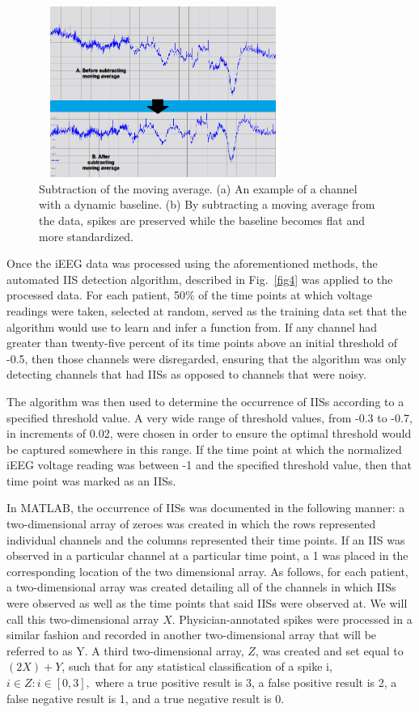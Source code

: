 \documentclass[letterpaper, 10pt, conference]{ieeeconf}      %
\begin{document}
\begin{figure}[t!]
    \centering
    \includegraphics[height=2.2in, width=3.2in]{MovingAvgTechniques.png}
    \caption{Subtraction of the moving average. (a) An example of a channel with a dynamic baseline. (b) By subtracting a moving average from the data, spikes are preserved while the baseline becomes flat and more standardized.}
    \label{fig3}
\end{figure}

Once the iEEG data was processed using the aforementioned methods, the automated IIS detection algorithm, described in Fig.~\ref{fig4} was applied to the processed data. For each patient, 50\% of the time points at which voltage readings were taken, selected at random, served as the training data set that the algorithm would use to learn and infer a function from. If any channel had greater than twenty-five percent of its time points above an initial threshold of -0.5, then those channels were disregarded, ensuring that the algorithm was only detecting channels that had IISs as opposed to channels that were noisy. 

The algorithm was then used to determine the occurrence of IISs according to a specified threshold value. A very wide range of threshold values, from -0.3 to -0.7, in increments of 0.02, were chosen in order to ensure the optimal threshold would be captured somewhere in this range. If the time point at which the normalized iEEG voltage reading was between -1 and the specified threshold value, then that time point was marked as an IISs. 

In MATLAB, the occurrence of IISs was documented in the following manner: a two-dimensional array of zeroes was created in which the rows represented individual channels and the columns represented their time points. If an IIS was observed in a particular channel at a particular time point, a 1 was placed in the corresponding location of the two dimensional array. As follows, for each patient, a two-dimensional array was created detailing all of the channels in which IISs were observed as well as the time points that said IISs were observed at. We will call this two-dimensional array $X$. Physician-annotated spikes were processed in a similar fashion and recorded in another two-dimensional array that will be referred to as Y. A third two-dimensional array, $Z$, was created and set equal to $(2X)+Y$, such that for any statistical classification of a spike i, $i \in Z:i \in [0, 3],$ where a true positive result is 3, a false positive result is 2, a false negative result is 1, and a true negative result is 0. 
\end{document}
